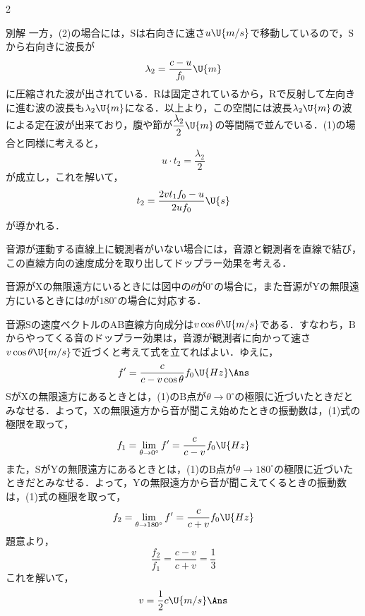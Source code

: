 \begin{multicols}{2}
\begin{bsHosoku}{別解}
一方，(2)の場合には，$\mathrm{S}$は右向きに速さ$u\U{m/s}$で移動しているので，$\mathrm{S}$から右向きに波長が
\[\lambda_2=\frac{c-u}{f_0}\U{m}\]
に圧縮された波が出されている．$\mathrm{R}$は固定されているから，$\mathrm{R}$で反射して左向きに進む波の波長も$\lambda_2\U{m}$になる．以上より，この空間には波長$\lambda_2\U{m}$の波による定在波が出来ており，腹や節が$\dfrac{\lambda_2}{2}\U{m}$の等間隔で並んでいる．(1)の場合と同様に考えると，
\[u\cdot t_2=\frac{\lambda_2}{2}\]
が成立し，これを解いて，
\[t_2=\frac{2vt_1f_0-u}{2uf_0}\U{s}\]
が導かれる．
\end{bsHosoku}

\par\nopagebreak
\begin{sisin}
音源が運動する直線上に観測者がいない場合には，音源と観測者を直線で結び，この直線方向の速度成分を取り出してドップラー効果を考える．

音源が$\mathrm{X}$の無限遠方にいるときには図中の$\theta$が$0^\circ$の場合に，また音源が$\mathrm{Y}$の無限遠方にいるときには$\theta$が$180^\circ$の場合に対応する．
\end{sisin}
\KaiHead
\begin{komon}
 音源$\mathrm{S}$の速度ベクトルの$\mathrm{AB}$直線方向成分は$v\cos\theta\U{m/s}$である．すなわち，$\mathrm{B}$からやってくる音のドップラー効果は，音源が観測者に向かって速さ$v\cos\theta\U{m/s}$で近づくと考えて式を立てればよい．ゆえに，
       \[f^\prime=\frac{c}{c-v\cos\theta}f_0\U{Hz}\Ans\]
 $\mathrm{S}$が$\mathrm{X}$の無限遠方にあるときとは，(1)の$\mathrm{B}$点が$\theta\to0^\circ$の極限に近づいたときだとみなせる．よって，$\mathrm{X}$の無限遠方から音が聞こえ始めたときの振動数は，(1)式の極限を取って，
       \[f_1=\lim_{\theta\to0^\circ}f^\prime=\frac{c}{c-v}f_0\U{Hz}\]
       また，$\mathrm{S}$が$\mathrm{Y}$の無限遠方にあるときとは，(1)の$\mathrm{B}$点が$\theta\to180^\circ$の極限に近づいたときだとみなせる．よって，$\mathrm{Y}$の無限遠方から音が聞こえてくるときの振動数は，(1)式の極限を取って，
       \[f_2=\lim_{\theta\to180^\circ}f^\prime=\frac{c}{c+v}f_0\U{Hz}\]
       題意より，
       \[\frac{f_2}{f_1}=\frac{c-v}{c+v}=\frac{1}{3}\]
       これを解いて，
       \[v=\frac{1}{2}c\U{m/s}\Ans\]
\end{komon}


\end{multicols}
